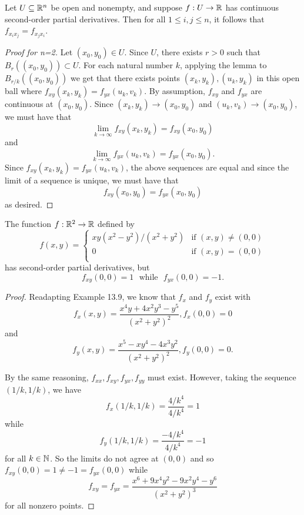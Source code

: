 \documentclass[letterpaper, twoside, 12pt]{book}
\begin{document}
\begin{theorem}[13.10]
  Let \(U\subseteq \mathbb R^n\) be open and nonempty, and suppose
  \(f:U\to\mathbb R\) has continuous second-order partial derivatives.
  Then for all \(1\leq i,j\leq n\), it follows that
  \(f_{x_ix_j}=f_{x_jx_i}\).
\end{theorem}

\begin{proof}[Proof for n=2]
    Let \((x_0, y_0) \in U\). Since \(U\), there exists \(r > 0\)
    such that \(B_{r}((x_0, y_0)) \subset U\). For each natural
    number \(k\), applying the lemma to \(B_{r/k}((x_0, y_0))\)
    we get that there exists points \((x_k, y_k), (u_k, y_k)\)
    in this open ball where \( f_{xy}(x_k, y_k) = f_{yx}(u_k, v_k)\).
    By assumption, \(f_{xy}\) and \(f_{yx}\) are continuous at
    \((x_0, y_0)\). Since \((x_k, y_k) \to (x_0, y_0)\) and 
    \((u_k, v_k) \to (x_0, y_0)\), we must have that
    \[ \lim_{k \to \infty} f_{xy}(x_k, y_k) = f_{xy}(x_0, y_0) \]
    and 
    \[ \lim_{k \to \infty} f_{yx}(u_k, v_k) = f_{yx}(x_0, y_0).\]
    Since \(f_{xy}(x_k, y_k) = f_{yx}(u_k, v_k)\), the above
    sequences are equal and since the limit of a sequence is
    unique, we must have that
    \[ f_{xy}(x_0, y_0) = f_{yx}(x_0, y_0) \]
    as desired.
\end{proof}

\begin{example}[13.12, exercise 13]
  The function \(f:\mathbb R^2\to\mathbb R\) defined by
  \[
    f(x,y) = \begin{cases}
      xy(x^2-y^2)/(x^2+y^2) & \text{if } (x,y)\not=(0,0) \\
      0 & \text{if } (x,y)=(0,0) \\
    \end{cases}
  \]
  has second-order partial derivatives, but
  \[
    f_{xy}(0,0)=1
      ~~~\text{while}~~~
    f_{yx}(0,0)=-1
  .\]
\end{example}

\begin{proof}
    Readapting Example 13.9, we know that \(f_x\) and \(f_y\) exist
    with 
    \[ f_x(x, y) = \frac{ x^4y + 4x^2y^3 - y^5}{ (x^2 + y^2)^2 }, f_x(0,0) = 0 \]
    and
    \[ f_y(x, y) = \frac{x^5 - xy^4 - 4x^3y^2}{ (x^2 + y^2)^2 }, f_y(0,0) = 0 .\]

    By the same reasoning, \(f_{xx}, f_{xy}, f_{yx}, f_{yy}\) must exist. However,
    taking the sequence \((1/k, 1/k)\), we have
    \[ f_x(1/k, 1/k) = \frac{4 / k^4}{4/ k^4} = 1 \]
    while
    \[ f_y(1/k, 1/k) = \frac{-4 / k^4}{4 / k^4} = -1 \]
    for all \(k \in \mathbb N\). So the limits do not agree at \((0,0)\)
    and so \(f_{xy}(0,0) = 1 \neq -1 = f_{yx}(0,0)\) while 
    \[ f_{xy} = f_{yx} = \frac{x^6 + 9x^4y^2 -9x^2y^4 - y^6}{ (x^2 + y^2)^3} \]
    for all nonzero points.
\end{proof}
\end{document}
